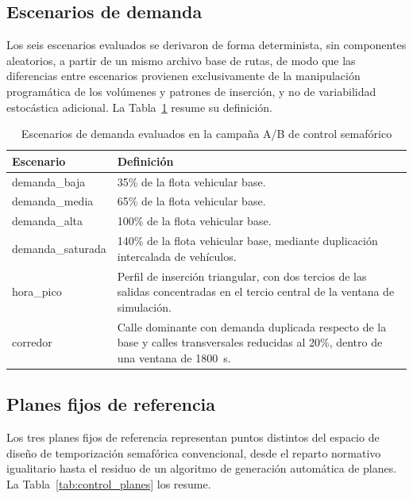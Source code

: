 \subsection{Escenarios de demanda}
\label{subsec:control_escenarios}

Los seis escenarios evaluados se derivaron de forma determinista, sin componentes
aleatorios, a partir de un mismo archivo base de rutas, de
modo que las diferencias entre escenarios provienen exclusivamente de la manipulación
programática de los volúmenes y patrones de inserción, y no de variabilidad estocástica
adicional. La Tabla~\ref{tab:control_escenarios} resume su definición.

\begin{table}[htbp]
\renewcommand{\arraystretch}{1.3}
\caption{Escenarios de demanda evaluados en la campaña A/B de control semafórico}
\label{tab:control_escenarios}
\centering
\footnotesize
\begin{tabular}{lp{}}
\hline
\textbf{Escenario} & \textbf{Definición} \\
\hline
demanda\_baja    & 35\% de la flota vehicular base. \\
demanda\_media   & 65\% de la flota vehicular base. \\
demanda\_alta    & 100\% de la flota vehicular base. \\
demanda\_saturada & 140\% de la flota vehicular base, mediante duplicación intercalada de vehículos. \\
hora\_pico        & Perfil de inserción triangular, con dos tercios de las salidas concentradas
                      en el tercio central de la ventana de simulación. \\
corredor          & Calle dominante con demanda duplicada respecto de la base y calles
                      transversales reducidas al 20\%, dentro de una ventana de 1800~s. \\
\hline
\end{tabular}
\end{table}

\subsection{Planes fijos de referencia}
\label{subsec:control_planes}

Los tres planes fijos de referencia representan puntos distintos del espacio de diseño
de temporización semafórica convencional, desde el reparto normativo igualitario hasta
el residuo de un algoritmo de generación automática de planes. La
Tabla~\ref{tab:control_planes} los resume.

